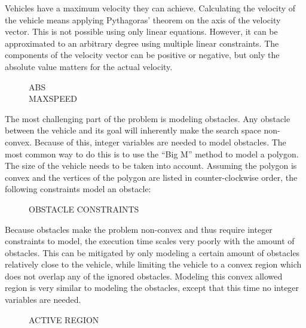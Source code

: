 Vehicles have a maximum velocity they can achieve. Calculating the velocity of the vehicle means applying Pythagoras' theorem on the axis of the velocity vector. This is not possible using only linear equations. However, it can be approximated to an arbitrary degree using multiple linear constraints. The components of the velocity vector can be positive or negative, but only the absolute value matters for the actual velocity. 
\begin{figure}[h]
ABS \\
MAXSPEED
\end{figure}

The most challenging part of the problem is modeling obstacles. Any obstacle between the vehicle and its goal will inherently make the search space non-convex. Because of this, integer variables are needed to model obstacles. The most common way to do this is to use the ``Big M'' method to model a polygon. The size of the vehicle needs to be taken into account. Assuming the polygon is convex and the vertices of the polygon are listed in counter-clockwise order, the following constraints model an obstacle:

\begin{figure}[h]
OBSTACLE CONSTRAINTS \\
\end{figure}

Because obstacles make the problem non-convex and thus require integer constraints to model, the execution time scales very poorly with the amount of obstacles. This can be mitigated by only modeling a certain amount of obstacles relatively close to the vehicle, while limiting the vehicle to a convex region which does not overlap any of the ignored obstacles. Modeling this convex allowed region is very similar to modeling the obstacles, except that this time no integer variables are needed.

\begin{figure}[h]
ACTIVE REGION\\
\end{figure}